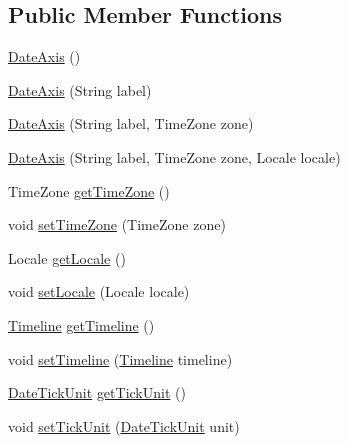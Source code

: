 \subsection*{Public Member Functions}
\begin{DoxyCompactItemize}
\item 
\mbox{\hyperlink{classorg_1_1jfree_1_1chart_1_1axis_1_1_date_axis_a352eb2aff66685f3a68039ed896f20cb}{Date\+Axis}} ()
\item 
\mbox{\hyperlink{classorg_1_1jfree_1_1chart_1_1axis_1_1_date_axis_a612cb63cb23fd18583e242f7268819b5}{Date\+Axis}} (String label)
\item 
\mbox{\hyperlink{classorg_1_1jfree_1_1chart_1_1axis_1_1_date_axis_ab89e8e04c67b64194f9d22048fdfd90f}{Date\+Axis}} (String label, Time\+Zone zone)
\item 
\mbox{\hyperlink{classorg_1_1jfree_1_1chart_1_1axis_1_1_date_axis_a772bdb421a615502265f4213c9d3f9b4}{Date\+Axis}} (String label, Time\+Zone zone, Locale locale)
\item 
Time\+Zone \mbox{\hyperlink{classorg_1_1jfree_1_1chart_1_1axis_1_1_date_axis_a93837dafa9a6141a5c995a5c2b40f936}{get\+Time\+Zone}} ()
\item 
void \mbox{\hyperlink{classorg_1_1jfree_1_1chart_1_1axis_1_1_date_axis_a135eb696e5b7b1ec0d5a2a85f857616a}{set\+Time\+Zone}} (Time\+Zone zone)
\item 
Locale \mbox{\hyperlink{classorg_1_1jfree_1_1chart_1_1axis_1_1_date_axis_a3ffd10d498c2d070d5cab66b24d5bb0c}{get\+Locale}} ()
\item 
void \mbox{\hyperlink{classorg_1_1jfree_1_1chart_1_1axis_1_1_date_axis_ab78678c5e689c8c71bd0c6ac696d3955}{set\+Locale}} (Locale locale)
\item 
\mbox{\hyperlink{interfaceorg_1_1jfree_1_1chart_1_1axis_1_1_timeline}{Timeline}} \mbox{\hyperlink{classorg_1_1jfree_1_1chart_1_1axis_1_1_date_axis_aa20fc8c4e5f6f50e17018e6e9e32fc33}{get\+Timeline}} ()
\item 
void \mbox{\hyperlink{classorg_1_1jfree_1_1chart_1_1axis_1_1_date_axis_aa30005af25b888f85af32135aa761159}{set\+Timeline}} (\mbox{\hyperlink{interfaceorg_1_1jfree_1_1chart_1_1axis_1_1_timeline}{Timeline}} timeline)
\item 
\mbox{\hyperlink{classorg_1_1jfree_1_1chart_1_1axis_1_1_date_tick_unit}{Date\+Tick\+Unit}} \mbox{\hyperlink{classorg_1_1jfree_1_1chart_1_1axis_1_1_date_axis_a8cc10a62c85228fd1431a9d15c7dabe8}{get\+Tick\+Unit}} ()
\item 
void \mbox{\hyperlink{classorg_1_1jfree_1_1chart_1_1axis_1_1_date_axis_a9a28298c67b281bc6f4dccff9af3fd59}{set\+Tick\+Unit}} (\mbox{\hyperlink{classorg_1_1jfree_1_1chart_1_1axis_1_1_date_tick_unit}{Date\+Tick\+Unit}} unit)

\end{DoxyCompactItemize}
